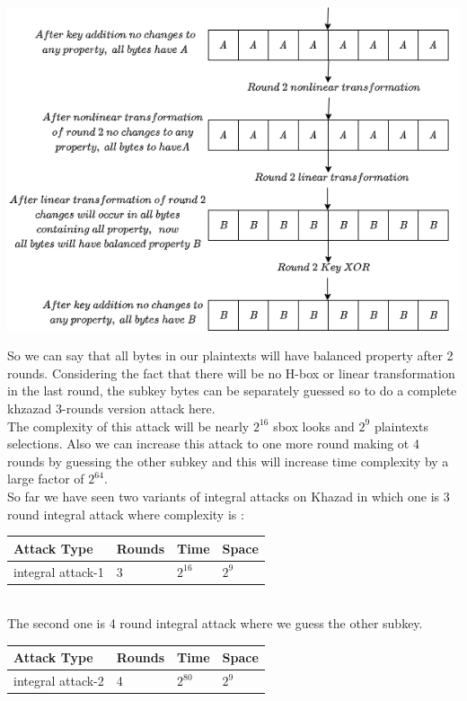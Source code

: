 \documentclass[preprint]{transcrypto}
\begin{document}
\begin{center}
    \includegraphics[scale=0.7]{Screenshots/r12.png}  
\end{center} 
So we can say that all bytes in our plaintexts will have balanced property after 2 rounds. Considering the fact that there will be no H-box or linear transformation in the last round, the subkey bytes can be separately guessed so to do a complete khzazad 3-rounds version attack here.\\
The complexity of this attack will be nearly $2^{16}$ sbox looks and $2^9$ plaintexts selections. Also we can increase this attack to one more round making ot 4 rounds by guessing the other subkey and this will increase time complexity by a large factor of $2^{64}$.\\
So far we have seen two variants of integral attacks on Khazad in which one is 3 round integral attack where complexity is : \\
\begin{table}[h]
\centering
\begin{tabular}{|l|l|l|l|}
\hline
Attack Type     & Rounds & Time     & Space \\ \hline
integral attack-1 & 3      & $2^{16}$ & $2^9$ \\ \hline
\end{tabular}
\end{table}
\\
The second one is 4 round integral attack where we guess the other subkey.
\begin{table}[h]
\centering
\begin{tabular}{|l|l|l|l|}
\hline
Attack Type     & Rounds & Time     & Space \\ \hline
integral attack-2 & 4      & $2^{80}$ & $2^9$ \\ \hline
\end{tabular}
\end{table}
\end{document}
